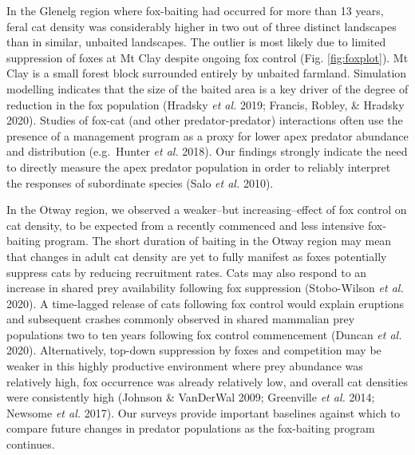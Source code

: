 \documentclass[]{elsarticle} %
\begin{document}
In the Glenelg region where fox-baiting had occurred for more than 13 years, feral cat density was considerably higher in two out of three distinct landscapes than in similar, unbaited landscapes. The outlier is most likely due to limited suppression of foxes at Mt Clay despite ongoing fox control (Fig. \ref{fig:foxplot}). Mt Clay is a small forest block surrounded entirely by unbaited farmland. Simulation modelling indicates that the size of the baited area is a key driver of the degree of reduction in the fox population (Hradsky \emph{et al.} 2019; Francis, Robley, \& Hradsky 2020). Studies of fox-cat (and other predator-predator) interactions often use the presence of a management program as a proxy for lower apex predator abundance and distribution (e.g.~Hunter \emph{et al.} 2018). Our findings strongly indicate the need to directly measure the apex predator population in order to reliably interpret the responses of subordinate species (Salo \emph{et al.} 2010).

In the Otway region, we observed a weaker--but increasing--effect of fox control on cat density, to be expected from a recently commenced and less intensive fox-baiting program. The short duration of baiting in the Otway region may mean that changes in adult cat density are yet to fully manifest as foxes potentially suppress cats by reducing recruitment rates. Cats may also respond to an increase in shared prey availability following fox suppression (Stobo-Wilson \emph{et al.} 2020). A time-lagged release of cats following fox control would explain eruptions and subsequent crashes commonly observed in shared mammalian prey populations two to ten years following fox control commencement (Duncan \emph{et al.} 2020). Alternatively, top-down suppression by foxes and competition may be weaker in this highly productive environment where prey abundance was relatively high, fox occurrence was already relatively low, and overall cat densities were consistently high (Johnson \& VanDerWal 2009; Greenville \emph{et al.} 2014; Newsome \emph{et al.} 2017). Our surveys provide important baselines against which to compare future changes in predator populations as the fox-baiting program continues.
\end{document}
